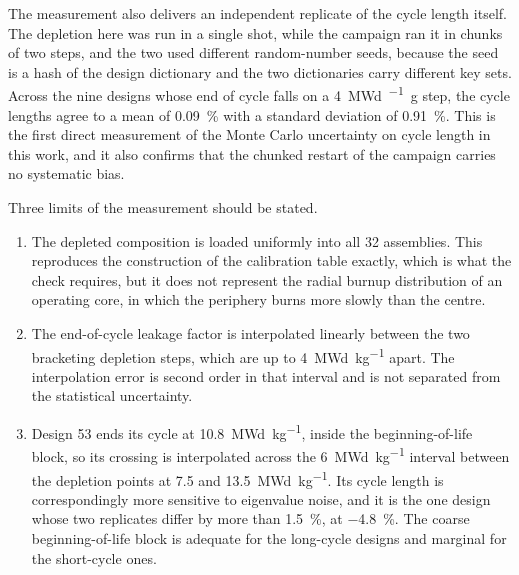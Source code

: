 The measurement also delivers an independent replicate of the cycle
length itself. The depletion here was run in a single shot, while the
campaign ran it in chunks of two steps, and the two used different
random-number seeds, because the seed is a hash of the design
dictionary and the two dictionaries carry different key sets. Across
the nine designs whose end of cycle falls on a \SI{4}{MWd\per\kilo
\gram} step, the cycle lengths agree to a mean of
\SI{+0.09}{\percent} with a standard deviation of
\SI{0.91}{\percent}. This is the first direct measurement of the
Monte Carlo uncertainty on cycle length in this work, and it also
confirms that the chunked restart of the campaign carries no
systematic bias.

Three limits of the measurement should be stated.

\begin{enumerate}
  \item The depleted composition is loaded uniformly into all
        \num{32} assemblies. This reproduces the construction of the
        calibration table exactly, which is what the check requires,
        but it does not represent the radial burnup distribution of an
        operating core, in which the periphery burns more slowly than
        the centre.

  \item The end-of-cycle leakage factor is interpolated linearly
        between the two bracketing depletion steps, which are up to
        \SI{4}{MWd\per\kilo\gram} apart. The interpolation error is
        second order in that interval and is not separated from the
        statistical uncertainty.

  \item Design 53 ends its cycle at \SI{10.8}{MWd\per\kilo\gram},
        inside the beginning-of-life block, so its crossing is
        interpolated across the \SI{6}{MWd\per\kilo\gram} interval
        between the depletion points at \num{7.5} and
        \SI{13.5}{MWd\per\kilo\gram}. Its cycle length is
        correspondingly more sensitive to eigenvalue noise, and it is
        the one design whose two replicates differ by more than
        \SI{1.5}{\percent}, at \SI{-4.8}{\percent}. The coarse
        beginning-of-life block is adequate for the long-cycle
        designs and marginal for the short-cycle ones.
\end{enumerate}


